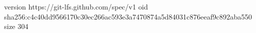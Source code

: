 version https://git-lfs.github.com/spec/v1
oid sha256:c4c40dd9566170c30ec266ac593e3a7470874a5d84031c876eeaf9c892aba550
size 304
